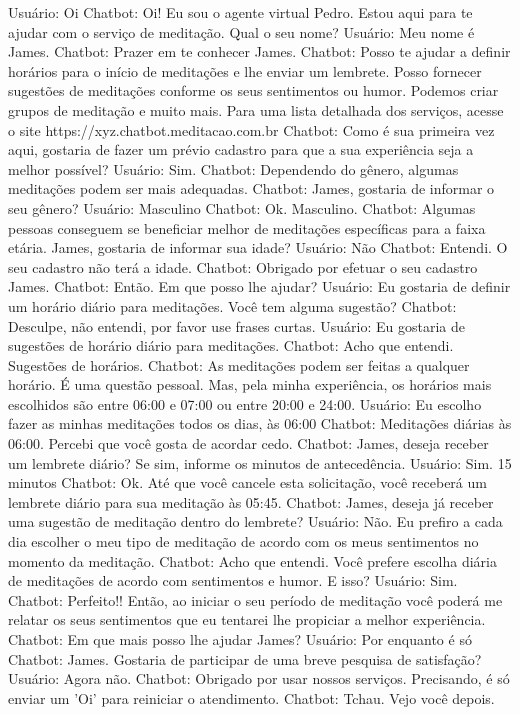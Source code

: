 Usuário:	Oi
Chatbot:	Oi! Eu sou o agente virtual Pedro. Estou aqui para te ajudar com o serviço de meditação. Qual o seu nome? 
Usuário:	Meu nome é James. 
Chatbot:	Prazer em te conhecer James.
Chatbot:	Posso te ajudar a definir horários para o início de meditações e lhe enviar um lembrete. Posso fornecer sugestões de meditações conforme os seus sentimentos ou humor. Podemos criar grupos de meditação e muito mais. Para uma lista detalhada dos serviços, acesse o site https://xyz.chatbot.meditacao.com.br
Chatbot:	Como é sua primeira vez aqui, gostaria de fazer um prévio cadastro para que a sua experiência seja a melhor possível? 
Usuário:	Sim.
Chatbot:	Dependendo do gênero, algumas meditações podem ser mais adequadas.
Chatbot:	James, gostaria de informar o seu gênero?
Usuário:	Masculino 
Chatbot:	Ok. Masculino.
Chatbot:	Algumas pessoas conseguem se beneficiar melhor de meditações específicas para a faixa etária. James, gostaria de informar sua idade?
Usuário:	Não
Chatbot:	Entendi. O seu cadastro não terá a idade.
Chatbot:	Obrigado por efetuar o seu cadastro James.
Chatbot:	Então. Em que posso lhe ajudar?
Usuário:	Eu gostaria de definir um horário diário para meditações. Você tem alguma sugestão?
Chatbot:	Desculpe, não entendi, por favor use frases curtas.
Usuário:	Eu gostaria de sugestões de horário diário para meditações.
Chatbot:	Acho que entendi. Sugestões de horários.
Chatbot:	As meditações podem ser feitas a qualquer horário. É uma questão pessoal. Mas, pela minha experiência, os horários mais escolhidos são entre 06:00 e 07:00 ou entre 20:00 e 24:00.
Usuário:	Eu escolho fazer as minhas meditações todos os dias, às 06:00
Chatbot:	Meditações diárias às 06:00. Percebi que você gosta de acordar cedo.
Chatbot:	James, deseja receber um lembrete diário? Se sim, informe os minutos de antecedência. 
Usuário:	Sim. 15 minutos 
Chatbot:	Ok. Até que você cancele esta solicitação, você receberá um lembrete diário para sua meditação às 05:45.
Chatbot:	James, deseja já receber uma sugestão de meditação dentro do lembrete?
Usuário:	Não. Eu prefiro a cada dia escolher o meu tipo de meditação de acordo com os meus sentimentos no momento da meditação.
Chatbot:	Acho que entendi. Você prefere escolha diária de meditações de acordo com sentimentos e humor. E isso?
Usuário:	Sim.
Chatbot:	Perfeito!! Então, ao iniciar o seu período de meditação você poderá me relatar os seus sentimentos que eu tentarei lhe propiciar a melhor experiência.
Chatbot:	Em que mais posso lhe ajudar James?
Usuário:	Por enquanto é só
Chatbot:	James. Gostaria de participar de uma breve pesquisa de satisfação?
Usuário:	Agora não.
Chatbot:	Obrigado por usar nossos serviços. Precisando, é só enviar um 'Oi' para reiniciar o atendimento.
Chatbot:	Tchau. Vejo você depois.
